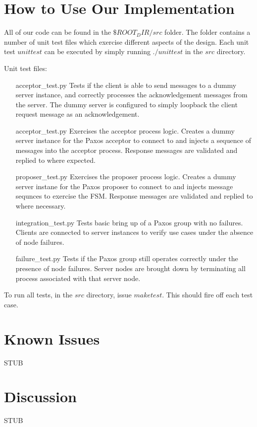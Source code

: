 \documentclass{article}
\begin{document}

\section{How to Use Our Implementation}

All of our code can be found in the $\${ROOT_DIR}/src$ folder.
The folder contains a number of unit test files which exercise different aspects of the design.
Each unit test $unittest$ can be executed by simply running $./unittest$ in the $src$ directory.

Unit test files:
\begin{itemize}
\item [acceptor\_test.py] Tests if the client is able to send messages to a dummy server instance, and correctly processes the acknowledgement messages from the server. 
  The dummy server is configured to simply loopback the client request message as an acknowledgement.
\item [acceptor\_test.py] Exercises the acceptor process logic. 
  Creates a dummy server instance for the Paxos acceptor to connect to and injects a sequence of messages into the acceptor process. 
  Response messages are validated and replied to where expected.
\item [proposer\_test.py] Exercises the proposer process logic.
  Creates a dummy server instane for the Paxos proposer to connect to and injects message sequnces to exercise the FSM.
  Response messages are validated and replied to where necessary.
\item [integration\_test.py] Tests basic bring up of a Paxos group with no failures.
  Clients are connected to server instances to verify use cases under the absence of node failures.
\item [failure\_test.py] Tests if the Paxos group still operates correctly under the presence of node failures.
  Server nodes are brought down by terminating all process associated with that server node.
\end{itemize}

To run all tests, in the $src$ directory, issue $make test$.
This should fire off each test case.


\section{Known Issues}

STUB


\section{Discussion}

STUB
\end{document}
